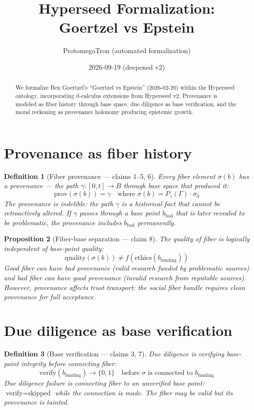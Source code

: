 \documentclass[11pt,a4paper]{article}
\title{Hyperseed Formalization:\\
  Goertzel vs Epstein}
\author{ProtomegaTron (automated formalization)}
\date{2026-09-19 (deepened v2)}
\newtheorem{definition}{Definition}[section]
\newtheorem{proposition}[definition]{Proposition}
\begin{document}
\maketitle

\begin{abstract}
We formalize Ben Goertzel's ``Goertzel vs Epstein'' (2026-02-20) within
the Hyperseed ontology, incorporating d-calculus extensions from
Hyperseed v2. Provenance is modeled as fiber history through base space,
due diligence as base verification, and the moral reckoning as
provenance holonomy producing epistemic growth.
\end{abstract}

\tableofcontents

\section{Provenance as fiber history}

\begin{definition}[Fiber provenance --- claims 1--5, 6]
Every fiber element $\sigma(b)$ has a \emph{provenance} --- the path
$\gamma: [0,t] \to B$ through base space that produced it:
\[
  \text{prov}(\sigma(b)) = \gamma \quad \text{where }
  \sigma(b) = P_\gamma(\Gamma) \cdot \sigma_0
\]
The provenance is indelible: the path $\gamma$ is a historical fact
that cannot be retroactively altered. If $\gamma$ passes through a
base point $b_{\text{bad}}$ that is later revealed to be problematic,
the provenance includes $b_{\text{bad}}$ permanently.
\end{definition}

\begin{proposition}[Fiber-base separation --- claim 8]
\label{prop:separation}
The quality of fiber is logically independent of base-point quality:
\[
  \text{quality}(\sigma(b)) \neq f(\text{ethics}(b_{\text{funding}}))
\]
Good fiber can have bad provenance (valid research funded by problematic
sources) and bad fiber can have good provenance (invalid research from
reputable sources). However, provenance affects \emph{trust transport}:
the social fiber bundle requires clean provenance for full acceptance.
\end{proposition}

\section{Due diligence as base verification}

\begin{definition}[Base verification --- claims 3, 7]
\emph{Due diligence} is verifying base-point integrity before connecting
fiber:
\[
  \text{verify}(b_{\text{funding}}) \to \{0, 1\} \quad
  \text{before } \sigma \text{ is connected to } b_{\text{funding}}
\]
Due diligence failure is connecting fiber to an unverified base point:
$\text{verify} = \text{skipped}$ while the connection is made. The
fiber may be valid but its provenance is tainted.
\end{definition}
\end{document}
